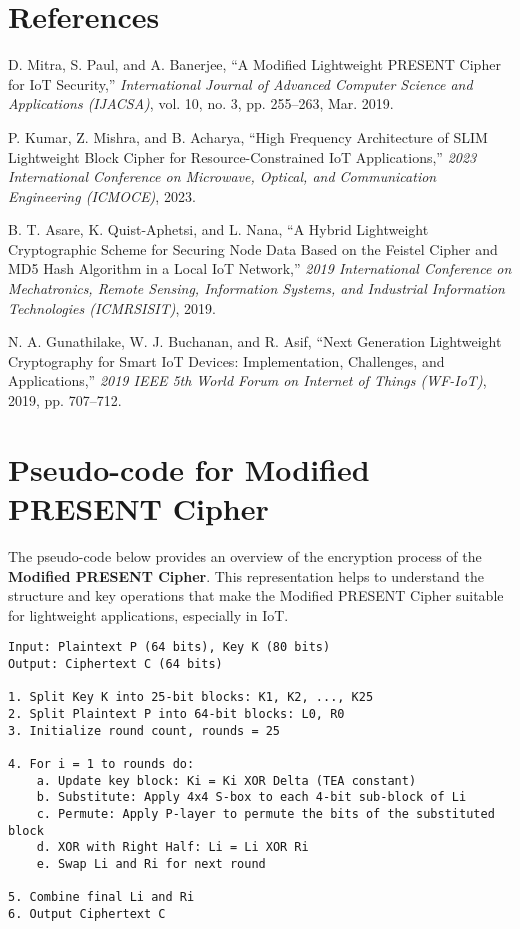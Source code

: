 \documentclass{article}
\begin{document}
\section{References}

\begin{thebibliography}{9}

D. Mitra, S. Paul, and A. Banerjee, ``A Modified Lightweight PRESENT Cipher for IoT Security,'' \emph{International Journal of Advanced Computer Science and Applications (IJACSA)}, vol. 10, no. 3, pp. 255--263, Mar. 2019.

P. Kumar, Z. Mishra, and B. Acharya, ``High Frequency Architecture of SLIM Lightweight Block Cipher for Resource-Constrained IoT Applications,'' \emph{2023 International Conference on Microwave, Optical, and Communication Engineering (ICMOCE)}, 2023.

B. T. Asare, K. Quist-Aphetsi, and L. Nana, ``A Hybrid Lightweight Cryptographic Scheme for Securing Node Data Based on the Feistel Cipher and MD5 Hash Algorithm in a Local IoT Network,'' \emph{2019 International Conference on Mechatronics, Remote Sensing, Information Systems, and Industrial Information Technologies (ICMRSISIT)}, 2019.

N. A. Gunathilake, W. J. Buchanan, and R. Asif, ``Next Generation Lightweight Cryptography for Smart IoT Devices: Implementation, Challenges, and Applications,'' \emph{2019 IEEE 5th World Forum on Internet of Things (WF-IoT)}, 2019, pp. 707--712.

\end{thebibliography}

\appendix

\section{Pseudo-code for Modified PRESENT Cipher}

The pseudo-code below provides an overview of the encryption process of the \textbf{Modified PRESENT Cipher}. This representation helps to understand the structure and key operations that make the Modified PRESENT Cipher suitable for lightweight applications, especially in IoT.

\begin{verbatim}
Input: Plaintext P (64 bits), Key K (80 bits)
Output: Ciphertext C (64 bits)

1. Split Key K into 25-bit blocks: K1, K2, ..., K25
2. Split Plaintext P into 64-bit blocks: L0, R0
3. Initialize round count, rounds = 25

4. For i = 1 to rounds do:
    a. Update key block: Ki = Ki XOR Delta (TEA constant)
    b. Substitute: Apply 4x4 S-box to each 4-bit sub-block of Li
    c. Permute: Apply P-layer to permute the bits of the substituted block
    d. XOR with Right Half: Li = Li XOR Ri
    e. Swap Li and Ri for next round

5. Combine final Li and Ri
6. Output Ciphertext C
\end{verbatim}
\end{document}
